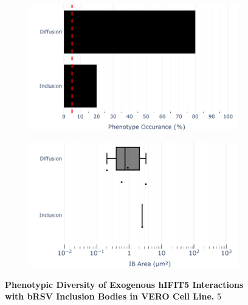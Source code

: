 \begin{figure}
    \begin{subfigure}{0.495\textwidth}
        \caption{}
        \includegraphics[width=1\linewidth]{09. Chapter 4/Figs/04. Overexpression/03. IFIT5/04. bar_i5_brsv.pdf} 
    \end{subfigure}
    \begin{subfigure}{0.495\textwidth}
        \caption{}
        \includegraphics[width=1\linewidth]{09. Chapter 4/Figs/04. Overexpression/03. IFIT5/05. box_i5_brsv.pdf}
    \end{subfigure}
    \caption[Phenotypic Diversity of Exogenous hIFIT5 Interactions with bRSV Inclusion Bodies in VERO Cell Line.]{\textbf{Phenotypic Diversity of Exogenous hIFIT5 Interactions with bRSV Inclusion Bodies in VERO Cell Line.} 5}
    \label{fig:Phenotypic Diversity of Exogenous hIFIT5 Interactions with bRSV Inclusion Bodies in VERO Cell Line}
\end{figure}

